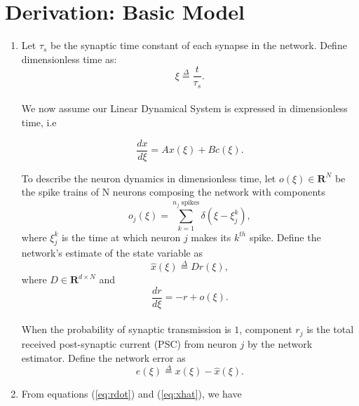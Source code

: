 \section{Derivation: Basic Model}
\label{section:derivation:basic_model}
\begin{enumerate}
    \item Let $\tau_s$ be the synaptic time constant of each synapse in the network. Define dimensionless time as:
    \begin{equation*}
        \xi \overset{\Delta}{=} \frac{t}{\tau_s}.
    \end{equation*}\\
    We now assume our Linear Dynamical System is expressed in dimensionless time, i.e
    
    \begin{equation}
        \label{eq:lds_dimensionless}
        \frac{dx}{d\xi} = Ax(\xi) + B c(\xi).
    \end{equation}
    
    To describe the neuron dynamics in dimensionless time, let $o(\xi) \in \mathbf{R}^{N}$ be the spike trains of N neurons composing the network with components
    \begin{equation*}
        o_j(\xi) = \sum_{k=1}^{\text{$n_j$ spikes}} \delta(\xi - \xi_{j}^{k}),
    \end{equation*}
    where $\xi_j^k$ is the time at which neuron $j$ makes its $k^{th}$ spike. 
    Define the network's estimate of the state variable as
    \begin{equation}
        \label{eq:xhat}
        \hat{x}(\xi)
        \overset{\Delta}{=} D r(\xi), 
    \end{equation}
    where $D \in \mathbf{R}^{d \times N}$ and 
    \begin{equation}
    \label{eq:rdot}
        \frac{dr}{d \xi} = -r + o(\xi).
    \end{equation}\\
    When the probability of synaptic transmission is $1$, component $r_j$ is the total received post-synaptic current (PSC) from neuron $j$ by the network estimator. 
    Define the network error as
    \begin{equation}
    \label{eq:error_def}
        e(\xi) \overset{\Delta}{=} x(\xi) - \hat{x}(\xi).
    \end{equation}
    
    \item From equations (\ref{eq:rdot}) and (\ref{eq:xhat}), we have
    

\end{enumerate}
